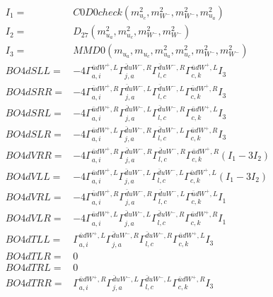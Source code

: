\documentclass[A4,landscape]{article}
\begin{document}
\begin{align} 
I_1 = & C0D0check(m^2_{u_{{c}}}, m^2_{W^-}, m^2_{W^-}, m^2_{u_{{a}}}) \\ 
I_2 = & D_{27}(m^2_{u_{{a}}}, m^2_{u_{{c}}}, m^2_{W^-}, m^2_{W^-}) \\ 
I_3 = & MMD0(m_{u_{{a}}}, m_{u_{{c}}}, m^2_{u_{{a}}}, m^2_{u_{{c}}}, m^2_{W^-}, m^2_{W^-}) \\ 
  BO4dSLL= & -4  \Gamma^{\bar{u}d W^+,L}_{a, i} \Gamma^{\bar{d}u W^- ,R}_{j, a} \Gamma^{\bar{d}u W^- ,R}_{l, c} \Gamma^{\bar{u}d W^+,L}_{c, k} I_3 \\ 
  BO4dSRR= & -4  \Gamma^{\bar{u}d W^+,R}_{a, i} \Gamma^{\bar{d}u W^- ,L}_{j, a} \Gamma^{\bar{d}u W^- ,L}_{l, c} \Gamma^{\bar{u}d W^+,R}_{c, k} I_3 \\ 
  BO4dSRL= & -4  \Gamma^{\bar{u}d W^+,R}_{a, i} \Gamma^{\bar{d}u W^- ,L}_{j, a} \Gamma^{\bar{d}u W^- ,R}_{l, c} \Gamma^{\bar{u}d W^+,L}_{c, k} I_3 \\ 
  BO4dSLR= & -4  \Gamma^{\bar{u}d W^+,L}_{a, i} \Gamma^{\bar{d}u W^- ,R}_{j, a} \Gamma^{\bar{d}u W^- ,L}_{l, c} \Gamma^{\bar{u}d W^+,R}_{c, k} I_3 \\ 
  BO4dVRR= & -4  \Gamma^{\bar{u}d W^+,R}_{a, i} \Gamma^{\bar{d}u W^- ,R}_{j, a} \Gamma^{\bar{d}u W^- ,R}_{l, c} \Gamma^{\bar{u}d W^+,R}_{c, k} (I_1 - 3 I_2) \\ 
  BO4dVLL= & -4  \Gamma^{\bar{u}d W^+,L}_{a, i} \Gamma^{\bar{d}u W^- ,L}_{j, a} \Gamma^{\bar{d}u W^- ,L}_{l, c} \Gamma^{\bar{u}d W^+,L}_{c, k} (I_1 - 3 I_2) \\ 
  BO4dVRL= & -4  \Gamma^{\bar{u}d W^+,R}_{a, i} \Gamma^{\bar{d}u W^- ,R}_{j, a} \Gamma^{\bar{d}u W^- ,L}_{l, c} \Gamma^{\bar{u}d W^+,L}_{c, k} I_1 \\ 
  BO4dVLR= & -4  \Gamma^{\bar{u}d W^+,L}_{a, i} \Gamma^{\bar{d}u W^- ,L}_{j, a} \Gamma^{\bar{d}u W^- ,R}_{l, c} \Gamma^{\bar{u}d W^+,R}_{c, k} I_1 \\ 
  BO4dTLL= &  \Gamma^{\bar{u}d W^+,L}_{a, i} \Gamma^{\bar{d}u W^- ,R}_{j, a} \Gamma^{\bar{d}u W^- ,R}_{l, c} \Gamma^{\bar{u}d W^+,L}_{c, k} I_3 \\ 
  BO4dTLR= & 0 \\ 
  BO4dTRL= & 0 \\ 
  BO4dTRR= &  \Gamma^{\bar{u}d W^+,R}_{a, i} \Gamma^{\bar{d}u W^- ,L}_{j, a} \Gamma^{\bar{d}u W^- ,L}_{l, c} \Gamma^{\bar{u}d W^+,R}_{c, k} I_3 \\ 
\end{align} 
\end{document}
